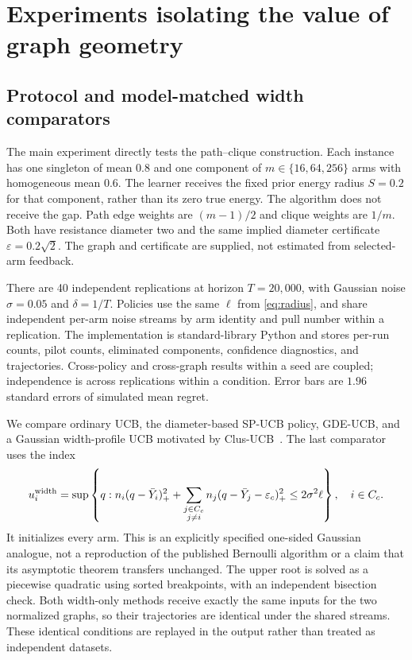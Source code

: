 \section{Experiments isolating the value of graph geometry}
\subsection{Protocol and model-matched width comparators}
The main experiment directly tests the path--clique construction. Each instance has one singleton of mean $0.8$ and one component of $m\in\{16,64,256\}$ arms with homogeneous mean $0.6$. The learner receives the fixed prior energy radius $S=0.2$ for that component, rather than its zero true energy. The algorithm does not receive the gap. Path edge weights are $(m-1)/2$ and clique weights are $1/m$. Both have resistance diameter two and the same implied diameter certificate $\varepsilon=0.2\sqrt2$. The graph and certificate are supplied, not estimated from selected-arm feedback.

There are 40 independent replications at horizon $T=20{,}000$, with Gaussian noise $\sigma=0.05$ and $\delta=1/T$. Policies use the same $\ell$ from \eqref{eq:radius}, and share independent per-arm noise streams by arm identity and pull number within a replication. The implementation is standard-library Python and stores per-run counts, pilot counts, eliminated components, confidence diagnostics, and trajectories. Cross-policy and cross-graph results within a seed are coupled; independence is across replications within a condition. Error bars are $1.96$ standard errors of simulated mean regret.

We compare ordinary UCB, the diameter-based SP-UCB policy, GDE-UCB, and a Gaussian width-profile UCB motivated by Clus-UCB~\cite{gore2025}. The last comparator uses the index
\begin{equation}
 u_i^{\rm width}=\sup\left\{q:
 n_i(q-\bar Y_i)_+^2+
 \sum_{\substack{j\in C_c\\j\ne i}}n_j(q-\bar Y_j-\varepsilon_c)_+^2
 \le2\sigma^2\ell\right\},\quad i\in C_c.
 \label{eq:widthprofile}
\end{equation}
It initializes every arm. This is an explicitly specified one-sided Gaussian analogue, not a reproduction of the published Bernoulli algorithm or a claim that its asymptotic theorem transfers unchanged. The upper root is solved as a piecewise quadratic using sorted breakpoints, with an independent bisection check. Both width-only methods receive exactly the same inputs for the two normalized graphs, so their trajectories are identical under the shared streams. These identical conditions are replayed in the output rather than treated as independent datasets.

